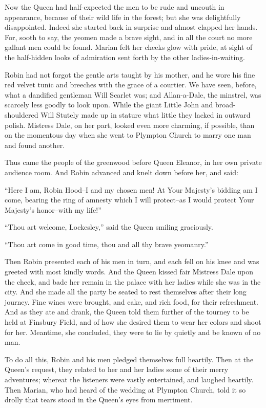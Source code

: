 Now the Queen had half-expected the men to be rude and uncouth in
appearance, because of their wild life in the forest; but she was
delightfully disappointed. Indeed she started back in surprise and
almost clapped her hands. For, sooth to say, the yeomen made a brave
sight, and in all the court no more gallant men could be found. Marian
felt her cheeks glow with pride, at sight of the half-hidden looks of
admiration sent forth by the other ladies-in-waiting.

Robin had not forgot the gentle arts taught by his mother, and he wore
his fine red velvet tunic and breeches with the grace of a courtier. We
have seen, before, what a dandified gentleman Will Scarlet was; and
Allan-a-Dale, the minstrel, was scarcely less goodly to look upon. While
the giant Little John and broad-shouldered Will Stutely made up in
stature what little they lacked in outward polish. Mistress Dale, on her
part, looked even more charming, if possible, than on the momentous day
when she went to Plympton Church to marry one man and found another.

Thus came the people of the greenwood before Queen Eleanor, in her own
private audience room. And Robin advanced and knelt down before her, and
said:

``Here I am, Robin Hood--I and my chosen men! At Your Majesty's bidding
am I come, bearing the ring of amnesty which I will protect--as I would
protect Your Majesty's honor--with my life!''

``Thou art welcome, Lockesley,'' said the Queen smiling graciously.

``Thou art come in good time, thou and all thy brave yeomanry.''

Then Robin presented each of his men in turn, and each fell on his knee
and was greeted with most kindly words. And the Queen kissed fair
Mistress Dale upon the cheek, and bade her remain in the palace with her
ladies while she was in the city. And she made all the party be seated
to rest themselves after their long journey. Fine wines were brought,
and cake, and rich food, for their refreshment. And as they ate and
drank, the Queen told them further of the tourney to be held at Finsbury
Field, and of how she desired them to wear her colors and shoot for her.
Meantime, she concluded, they were to lie by quietly and be known of no
man.

To do all this, Robin and his men pledged themselves full heartily. Then
at the Queen's request, they related to her and her ladies some of their
merry adventures; whereat the listeners were vastly entertained, and
laughed heartily. Then Marian, who had heard of the wedding at Plympton
Church, told it so drolly that tears stood in the Queen's eyes from
merriment.

